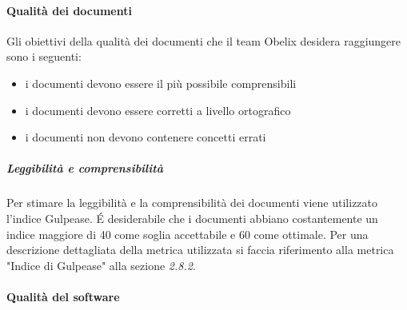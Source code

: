 \paragraph{Qualità dei documenti}
Gli obiettivi della qualità dei documenti che il team Obelix desidera raggiungere sono i seguenti:
\begin{itemize}
\item i documenti devono essere il più possibile comprensibili
\item i documenti devono essere corretti a livello ortografico
\item i documenti non devono contenere concetti errati
\end{itemize}

\subparagraph{Leggibilità e comprensibilità}
Per stimare la leggibilità e la comprensibilità dei documenti
viene utilizzato l'indice Gulpease. \'E desiderabile che i documenti
abbiano costantemente un indice maggiore
di 40 come soglia accettabile e 60 come ottimale. Per una descrizione
dettagliata della metrica utilizzata si faccia riferimento
alla metrica "Indice di Gulpease" alla sezione
\emph{2.8.2}. %


\paragraph{Qualità del software}

